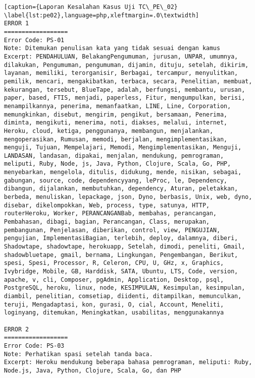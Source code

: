 \begin{enumerate}
\begin{lstlisting}[caption={Laporan Kesalahan Kasus Uji TC\_PE\_02}	\label{lst:pe02},language=php,xleftmargin=.0\textwidth]
ERROR 1
==================
Error Code: PS-01
Note: Ditemukan penulisan kata yang tidak sesuai dengan kamus
Excerpt: PENDAHULUAN, BelakangPengumuman, jurusan, UNPAR, umumnya, dilakukan, Pengumuman, pengumuman, dijamin, dituju, setelah, dikirim, layanan, memiliki, terorganisir, Berbagai, tercampur, menyulitkan, pemilik, mencari, mengakibatkan, terbaca, secara, Penelitian, membuat, kekurangan, tersebut, BlueTape, adalah, berfungsi, membantu, urusan, paper, based, FTIS, menjadi, paperless, Fitur, mengumpulkan, berisi, menampilkannya, penerima, memanfaatkan, LINE, Line, Corporation, memungkinkan, disebut, mengirim, pengikut, bersamaan, Penerima, diminta, mengikuti, menerima, noti, diakses, melalui, internet, Heroku, cloud, ketiga, penggunanya, membangun, menjalankan, mengoperasikan, Rumusan, memodi, berjalan, mengimplementasikan, menguji, Tujuan, Mempelajari, Memodi, Mengimplementasikan, Menguji, LANDASAN, landasan, dipakai, menjalan, mendukung, pemrograman, meliputi, Ruby, Node, js, Java, Python, Clojure, Scala, Go, PHP, menyebarkan, mengelola, ditulis, didukung, mende, nisikan, sebagai, gabungan, source, code, dependencyyang, leProc, le, Dependency, dibangun, dijalankan, membutuhkan, dependency, Aturan, peletakkan, berbeda, menuliskan, lepackage, json, Dyno, berbasis, Unix, web, dyno, disebar, dikelompokkan, Web, process, type, satunya, HTTP, routerHeroku, Worker, PERANCANGANBab, membahas, perancangan, Pembahasan, dibagi, bagian, Perancangan, Class, merupakan, pembangunan, Penjelasan, diberikan, control, view, PENGUJIAN, pengujian, ImplementasiBagian, terlebih, deploy, dalamnya, diberi, Shadowtape, shadowtape, herokuapp, Setelah, dimodi, peneliti, Gmail, shadowbluetape, gmail, bernama, Lingkungan, Pengembangan, Berikut, spesi, Spesi, Processor, R, Celeron, CPU, U, GHz, x, Graphics, Ivybridge, Mobile, GB, Harddisk, SATA, Ubuntu, LTS, Code, version, apache, v, cli, Composer, pgAdmin, Application, Desktop, psql, PostgreSQL, heroku, linux, node, KESIMPULAN, Kesimpulan, kesimpulan, diambil, penelitian, comsetiap, diidenti, ditampilkan, memunculkan, teruji, Mengadaptasi, kon, gurasi, O, cial, Account, Meneliti, loginyang, ditemukan, Meningkatkan, usabilitas, menggunakannya

ERROR 2
==================
Error Code: PS-03
Note: Perhatikan spasi setelah tanda baca.
Excerpt: Heroku mendukung beberapa bahasa pemrograman, meliputi: Ruby, Node.js, Java, Python, Clojure, Scala, Go, dan PHP


\end{lstlisting}
\end{enumerate}
